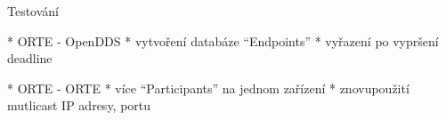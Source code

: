 \sec Testování

* ORTE - OpenDDS
\begitems
* vytvoření databáze ``Endpoints''
* vyřazení po vypršení deadline
\enditems

* ORTE - ORTE
\begitems
* více ``Participants'' na jednom zařízení
* znovupoužití mutlicast IP adresy, portu
\enditems

